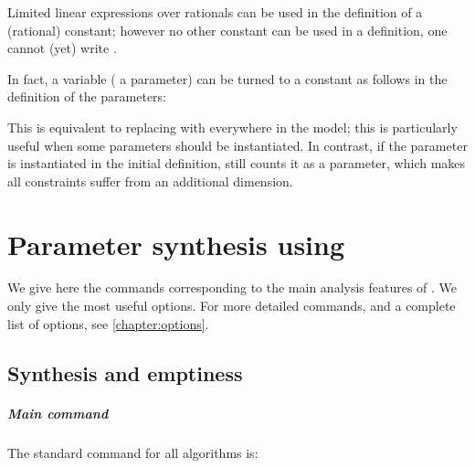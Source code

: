 Limited linear expressions over rationals can be used in the definition of a (rational) constant; however no other constant can be used in a definition, \ie{} one cannot (yet) write .


\begin{hint}
	In fact, a variable (\eg{} a parameter) can be turned to a constant as follows in the definition of the parameters:
	\begin{center}
	\end{center}
	This is equivalent to replacing  with  everywhere in the model; this is particularly useful when some parameters should be instantiated.
	In contrast, if the parameter is instantiated in the initial definition, \imitator{} still counts it as a parameter, which makes all constraints suffer from an additional dimension.
\end{hint}





\chapter{Parameter synthesis using \imitator{}}


We give here the commands corresponding to the main analysis features of \imitator{}.
We only give the most useful options.
For more detailed commands, and a complete list of options, see \cref{chapter:options}.

\section{Synthesis and emptiness}

\paragraph{Main command}
The standard \imitator{} command for all algorithms is:

